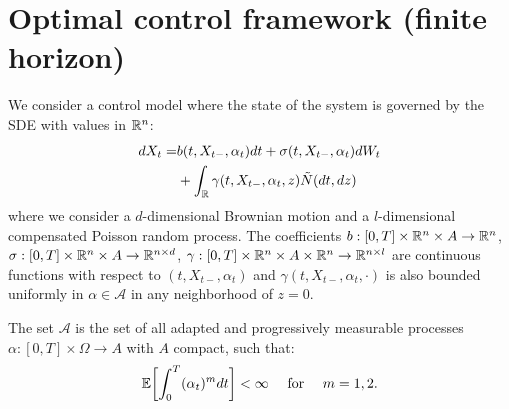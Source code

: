 \section{Optimal control framework (finite horizon)}\label{Optimal_control_framework}

We consider a control model where the state of the system is governed by the SDE with values in $\mathbb{R}^n$:
\begin{align}\label{controlled_SDE}
 dX_t =& b(t,X_{t-},\alpha_t) dt + \sigma (t,X_{t-},\alpha_t) dW_t \\ \nonumber
      &+ \int_{\mathbb{R}} \gamma(t,X_{t-},\alpha_t,z) \tilde N(dt,dz)
\end{align}
where we consider a $d$-dimensional Brownian motion and a $l$-dimensional compensated Poisson random process.
The coefficients $b: [0,T]\times \mathbb{R}^n \times A \to \mathbb{R}^n$, $\sigma: [0,T]\times \mathbb{R}^n \times A \to \mathbb{R}^{n\times d}$, 
$\gamma: [0,T]\times \mathbb{R}^n \times A \times \mathbb{R}^n \to \mathbb{R}^{n\times l}$ are continuous functions with respect to $(t,X_{t-},\alpha_t)$ and $\gamma(t,X_{t-},\alpha_t,\cdot)$ is also bounded
uniformly in $\alpha \in \mathcal{A}$ in any neighborhood of $z=0$. 

The set $\mathcal{A}$ is the set of all adapted and progressively measurable processes $\alpha: [0,T]\times \Omega \to  A$ with $A$ compact, such that:
$$ \mathbb{E} \biggl[ \int_0^T (\alpha_t)^m dt \biggr] < \infty \quad \mbox{ for } \quad m=1,2. $$

